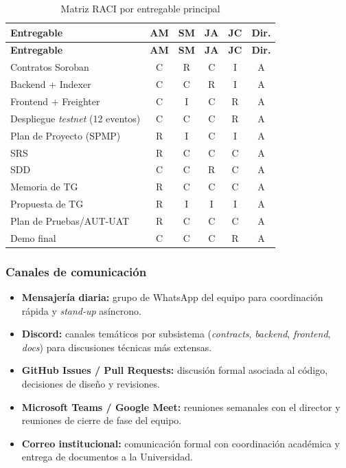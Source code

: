 \documentclass[12pt,oneside]{report}
\begin{document}
      \begin{longtable}{@{}p{4.8cm} c c c c c@{}}
        \caption{Matriz RACI por entregable principal}
        \label{tab:raci}\\
        \toprule
        \textbf{Entregable} & \textbf{AM} & \textbf{SM} & \textbf{JA} & \textbf{JC} & \textbf{Dir.}\\
        \midrule
        \endfirsthead
        \toprule
        \textbf{Entregable} & \textbf{AM} & \textbf{SM} & \textbf{JA} & \textbf{JC} & \textbf{Dir.}\\
        \midrule
        \endhead
        \bottomrule
        \endfoot
        Contratos Soroban & C & R & C & I & A\\
        Backend + Indexer & C & C & R & I & A\\
        Frontend + Freighter & C & I & C & R & A\\
        Despliegue \textit{testnet} (12 eventos) & C & C & C & R & A\\
        Plan de Proyecto (SPMP) & R & I & C & I & A\\
        SRS & R & C & C & C & A\\
        SDD & C & C & R & C & A\\
        Memoria de TG & R & C & C & C & A\\
        Propuesta de TG & R & I & I & I & A\\
        Plan de Pruebas/AUT-UAT & R & C & C & C & A\\
        Demo final & C & C & C & R & A\\
      \end{longtable}

      \subsubsection{Canales de comunicación}
      \begin{itemize}
        \item \textbf{Mensajería diaria:} grupo de WhatsApp del equipo para coordinación rápida y \textit{stand-up} asíncrono.
        \item \textbf{Discord:} canales temáticos por subsistema (\textit{contracts}, \textit{backend}, \textit{frontend}, \textit{docs}) para discusiones técnicas más extensas.
        \item \textbf{GitHub Issues / Pull Requests:} discusión formal asociada al código, decisiones de diseño y revisiones.
        \item \textbf{Microsoft Teams / Google Meet:} reuniones semanales con el director y reuniones de cierre de fase del equipo.
        \item \textbf{Correo institucional:} comunicación formal con coordinación académica y entrega de documentos a la Universidad.
      \end{itemize}
\end{document}
